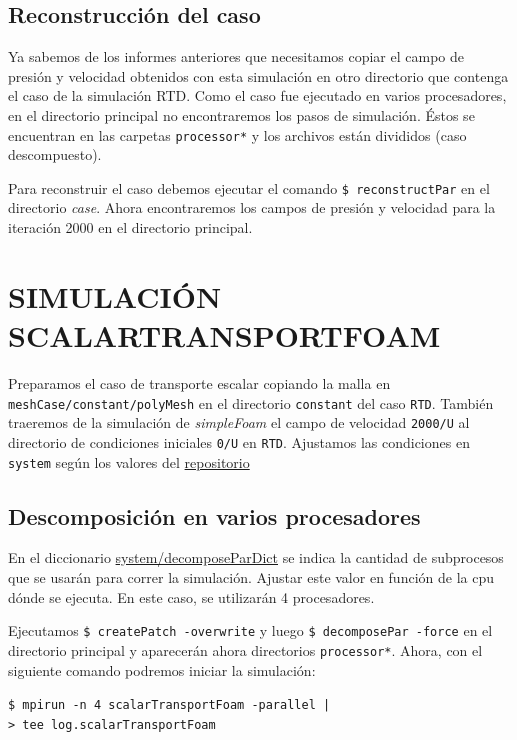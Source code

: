 \documentclass[oneside,a4paper,spanish,links]{amca}
\begin{document}
\subsection{Reconstrucción del caso}
Ya sabemos de los informes anteriores que necesitamos copiar el campo de presión y velocidad obtenidos con esta simulación en otro directorio que contenga el caso de la simulación RTD. Como el caso fue ejecutado en varios procesadores, en el directorio principal no encontraremos los pasos de simulación. Éstos se encuentran en las carpetas \texttt{processor*} y los archivos están divididos (caso descompuesto).

Para reconstruir el caso debemos ejecutar el comando \texttt{\$ reconstructPar} en el directorio \textit{case}. Ahora encontraremos los campos de presión y velocidad para la iteración 2000 en el directorio principal.

\section{SIMULACIÓN SCALARTRANSPORTFOAM}

Preparamos el caso de transporte escalar copiando la malla en \texttt{meshCase/constant/polyMesh} en el directorio \texttt{constant} del caso \texttt{RTD}. También traeremos de la simulación de \textit{simpleFoam} el campo de velocidad \texttt{2000/U} al directorio de condiciones iniciales \texttt{0/U} en \texttt{RTD}.
Ajustamos las condiciones en \texttt{system} según los valores del \href{https://github.com/guillerolle/casos_cfd/blob/master/03/RTD/system}{repositorio}

\subsection{Descomposición en varios procesadores}
En el diccionario \href{https://github.com/guillerolle/casos_cfd/blob/master/03/RTD/system/decomposeParDict}{system/decomposeParDict} se indica la cantidad de subprocesos que se usarán para correr la simulación. Ajustar este valor en función de la cpu dónde se ejecuta. En este caso, se utilizarán 4 procesadores.

Ejecutamos \texttt{\$ createPatch -overwrite} y luego \texttt{\$ decomposePar -force} en el directorio principal y aparecerán ahora directorios \texttt{processor*}. Ahora, con el siguiente comando podremos iniciar la simulación: \par 
\texttt{\$ mpirun -n 4 scalarTransportFoam -parallel | \\} 
\texttt{>  tee log.scalarTransportFoam}
\end{document}
